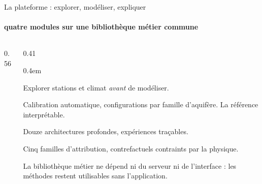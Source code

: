 \documentclass[aspectratio=169,11pt]{beamer}
\begin{document}
\begin{frame}{La plateforme : explorer, modéliser, expliquer}
\framesubtitle{ \textbullet{} quatre modules sur une bibliothèque métier commune}

\begin{columns}[T]
\begin{column}{0.56\textwidth}
\vspace{-0.15cm}
\vspace{0.15cm}
\end{column}

\begin{column}{0.41\textwidth}
\footnotesize
\begin{description}[Explicabilité]\itemsep0.4em
  \item[\color{bleuprofond}Observatoire] Explorer stations et climat \emph{avant} de modéliser.
  \item[\color{bleuprofond}Modèles métier] Calibration automatique, configurations par famille
        d'aquifère. La référence interprétable.
  \item[\color{bleuprofond}Apprentissage] Douze architectures profondes, expériences traçables.
  \item[\color{bleuprofond}Explicabilité] Cinq familles d'attribution, contrefactuels contraints
        par la physique.
\end{description}

\vspace{0.5em}
{\color{grisardoise} La bibliothèque métier ne dépend ni du serveur ni de l'interface : les
méthodes restent utilisables sans l'application.\par}
\end{column}
\end{columns}
\end{frame}
\end{document}
